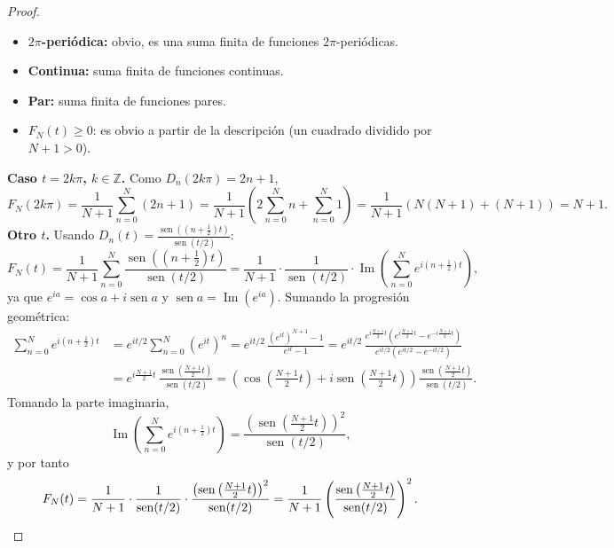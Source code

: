 \begin{proof}
\begin{itemize}
\item \textbf{$2\pi$-periódica:} obvio, es una suma finita de funciones $2\pi$-periódicas.
\item \textbf{Continua:} suma finita de funciones continuas.
\item \textbf{Par:} suma finita de funciones pares.
\item $F_N(t) \ge 0$: es obvio a partir de la descripción (un cuadrado dividido por $N+1>0$).
\end{itemize}
\textbf{Caso $t = 2k\pi$, $k \in \mathbb{Z}$.} Como $D_n(2k\pi) = 2n+1$,
\[
F_N(2k\pi) = \frac{1}{N+1}\sum_{n=0}^N (2n+1) = \frac{1}{N+1}\left( 2\sum_{n=0}^N n + \sum_{n=0}^N 1 \right) = \frac{1}{N+1}\left( N(N+1) + (N+1) \right) = N+1.
\]
\textbf{Otro $t$.} Usando $D_n(t) = \frac{\operatorname{sen}((n+\frac{1}{2})t)}{\operatorname{sen}(t/2)}$:
\[
F_N(t) = \frac{1}{N+1}\sum_{n=0}^N \frac{\operatorname{sen}((n+\frac{1}{2})t)}{\operatorname{sen}(t/2)} = \frac{1}{N+1} \cdot \frac{1}{\operatorname{sen}(t/2)} \cdot \operatorname{Im}\left( \sum_{n=0}^N e^{i(n+\frac{1}{2})t} \right),
\]
ya que $e^{ia} = \cos a + i\operatorname{sen} a$ y $\operatorname{sen} a = \operatorname{Im}(e^{ia})$. Sumando la progresión geométrica:
\begin{align*}
\sum_{n=0}^N e^{i(n+\frac{1}{2})t} &= e^{it/2}\sum_{n=0}^N (e^{it})^n = e^{it/2}\,\frac{(e^{it})^{N+1} - 1}{e^{it} - 1} = e^{it/2}\,\frac{e^{i\frac{N+1}{2}t}\left( e^{i\frac{N+1}{2}t} - e^{-i\frac{N+1}{2}t} \right)}{e^{it/2}\left( e^{it/2} - e^{-it/2} \right)} \\
&= e^{i\frac{N+1}{2}t} \,\frac{\operatorname{sen}\left(\frac{N+1}{2}t\right)}{\operatorname{sen}(t/2)} = \left( \cos\left(\tfrac{N+1}{2}t\right) + i\operatorname{sen}\left(\tfrac{N+1}{2}t\right) \right)\frac{\operatorname{sen}\left(\frac{N+1}{2}t\right)}{\operatorname{sen}(t/2)}.
\end{align*}
Tomando la parte imaginaria,
\[
\operatorname{Im}\left( \sum_{n=0}^N e^{i(n+\frac{1}{2})t} \right) = \frac{\left(\operatorname{sen}\left(\frac{N+1}{2}t\right)\right)^2}{\operatorname{sen}(t/2)},
\]
y por tanto
\[
F_N(t) = \frac{1}{N+1}\cdot\frac{1}{\operatorname{sen}(t/2)}\cdot\frac{\left(\operatorname{sen}\left(\frac{N+1}{2}t\right)\right)^2}{\operatorname{sen}(t/2)} = \frac{1}{N+1}\left( \frac{\operatorname{sen}\left(\frac{N+1}{2}t\right)}{\operatorname{sen}(t/2)} \right)^2. \qedhere
\]
\end{proof}

